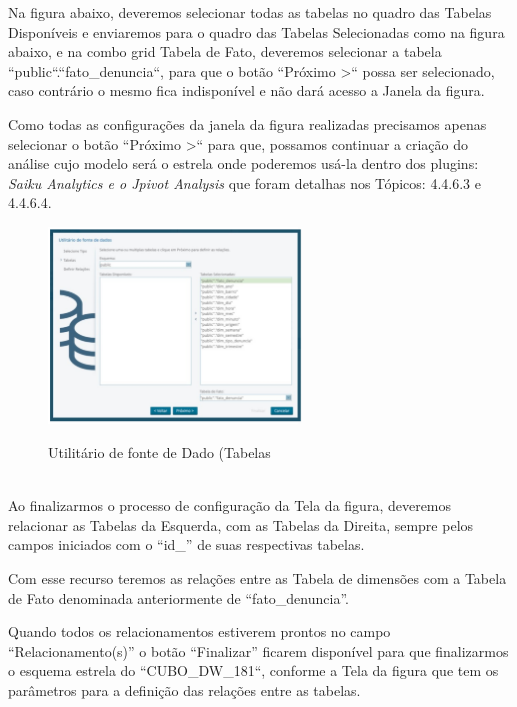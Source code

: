 Na figura abaixo, deveremos selecionar todas as tabelas no quadro das Tabelas Dispon\'{i}veis e enviaremos para o quadro das Tabelas Selecionadas como na 
figura abaixo, e na combo grid Tabela de Fato, deveremos selecionar a tabela ``public``.``fato_denuncia``, para que o bot\~{a}o ``Pr\'{o}ximo >`` possa ser 
selecionado, caso contr\'{a}rio o mesmo fica indispon\'{i}vel e n\~{a}o dar\'{a} acesso a Janela da figura. 

Como todas as configura\c{c}\~{o}es da janela da figura realizadas precisamos apenas selecionar o bot\~{a}o ``Pr\'{o}ximo >`` para que, possamos continuar a cria\c{c}\~{a}o do an\'{a}lise cujo modelo ser\'{a} 
o estrela onde poderemos us\'{a}-la dentro dos plugins: \textit{Saiku Analytics e o Jpivot Analysis} que foram detalhas nos T\'{o}picos: 4.4.6.3 e 4.4.6.4. 

\begin{figure}[H]
	\vspace*{0,2cm}
    \centering
    \caption{Utilit\'{a}rio de fonte de Dado (Tabelas}
    \includegraphics[width=0.6\textwidth]{./04-figuras/figura-puc-utiliario-fonte-de-dados-tabelas}
    \label{fig:ilustfigpucutiliariofontededadostabelas}
\end{figure}
\vspace*{-0,9cm}
{\raggedright {}} \\

Ao finalizarmos o processo de configura\c{c}\~{a}o da Tela da figura, deveremos relacionar as Tabelas da Esquerda, com as Tabelas da Direita, 
sempre pelos campos iniciados com o ``id\_'' de suas respectivas tabelas. 

Com esse recurso teremos as rela\c{c}\~{o}es entre as Tabela de dimens\~{o}es 
com a Tabela de Fato denominada anteriormente de ``fato_denuncia''. 

Quando todos os relacionamentos estiverem prontos no campo ``Relacionamento(s)'' 
o bot\~{a}o ``Finalizar'' ficarem dispon\'{i}vel para que finalizarmos o esquema estrela do ``CUBO\_DW\_181``, conforme a Tela da figura que tem os 
par\^{a}metros para a defini\c{c}\~{a}o das rela\c{c}\~{o}es entre as tabelas.


